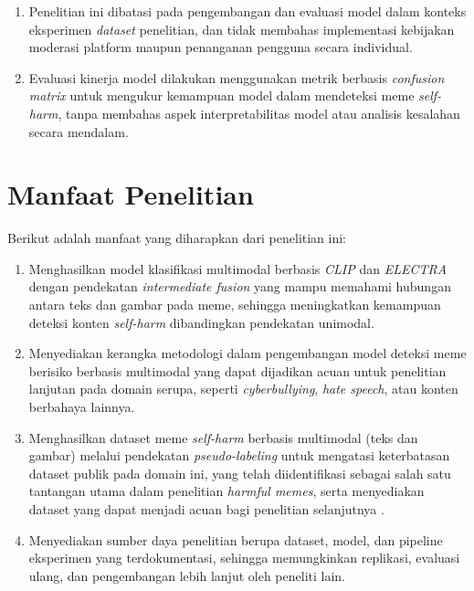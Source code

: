 \begin{enumerate}
    \item Penelitian ini dibatasi pada pengembangan dan evaluasi model dalam konteks eksperimen \textit{dataset} penelitian, dan tidak membahas implementasi kebijakan moderasi platform maupun penanganan pengguna secara individual.
    
    \item Evaluasi kinerja model dilakukan menggunakan metrik berbasis \textit{confusion matrix} untuk mengukur kemampuan model dalam mendeteksi meme \textit{self-harm}, tanpa membahas aspek interpretabilitas model atau analisis kesalahan secara mendalam.
\end{enumerate}

\section{Manfaat Penelitian} \label{I.Manfaat}
Berikut adalah manfaat yang diharapkan dari penelitian ini: \par
\begin{enumerate}
    \item Menghasilkan model klasifikasi multimodal berbasis \textit{CLIP} dan \textit{ELECTRA} dengan pendekatan \textit{intermediate fusion} yang mampu memahami hubungan antara teks dan gambar pada meme, sehingga meningkatkan kemampuan deteksi konten \textit{self-harm} dibandingkan pendekatan unimodal.
    
    \item Menyediakan kerangka metodologi dalam pengembangan model deteksi meme berisiko berbasis multimodal yang dapat dijadikan acuan untuk penelitian lanjutan pada domain serupa, seperti \textit{cyberbullying}, \textit{hate speech}, atau konten berbahaya lainnya.
    
    \item Menghasilkan dataset meme \textit{self-harm} berbasis multimodal (teks dan gambar) melalui pendekatan \textit{pseudo-labeling} untuk mengatasi keterbatasan dataset publik pada domain ini, yang telah diidentifikasi sebagai salah satu tantangan utama dalam penelitian \textit{harmful memes}, serta menyediakan dataset yang dapat menjadi acuan bagi penelitian selanjutnya \cite{Sharma2022HarmfulMemes}.
    
    \item Menyediakan sumber daya penelitian berupa dataset, model, dan pipeline eksperimen yang terdokumentasi, sehingga memungkinkan replikasi, evaluasi ulang, dan pengembangan lebih lanjut oleh peneliti lain.
\end{enumerate}


